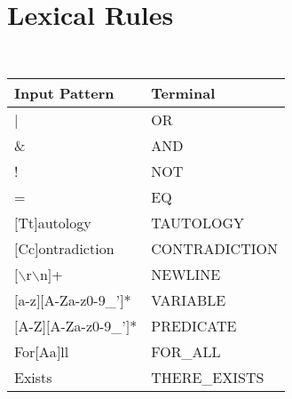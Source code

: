 \section{Lexical Rules}
\label{sec:appendix_lexer}

	{\tt
		\begin{tabular}{|l|l|}
			\hline
			\textbf{Input Pattern} & \textbf{Terminal} \\
			\hline
			|                    & OR  \\
			\&                   & AND \\
			!                    & NOT \\
			=                    & EQ  \\
			$[$Tt$]$autology     & TAUTOLOGY \\
			$[$Cc$]$ontradiction & CONTRADICTION \\
			$[\backslash$r$\backslash$n$]$+ & NEWLINE \\
			$[$a-z$][$A-Za-z0-9\_'$]$* & VARIABLE \\
			$[$A-Z$][$A-Za-z0-9\_'$]$* & PREDICATE \\
			For$[$Aa$]$ll        & FOR\_ALL \\
			Exists               & THERE\_EXISTS \\
			\hline
		\end{tabular}
	}

